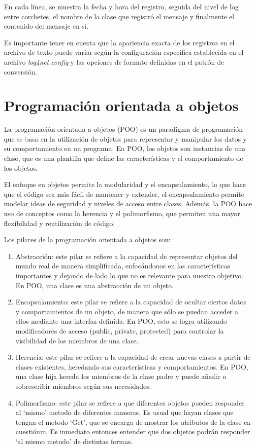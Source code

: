 \documentclass[executivepaper]{article}
\begin{document}
En cada línea, se muestra la fecha y hora del registro, seguida del nivel de log entre corchetes, el nombre de la clase que registró el mensaje y finalmente el contenido del mensaje en sí.

Es importante tener en cuenta que la apariencia exacta de los registros en el archivo de texto puede variar según la configuración específica establecida en el archivo \emph{log4net.config} y las opciones de formato definidas en el patrón de conversión.

\section{Programación orientada a objetos}

La programación orientada a objetos (POO) es un paradigma de programación que se basa en la utilización de objetos para representar y manipular los datos y su comportamiento en un programa. En POO, los objetos son instancias de una clase, que es una plantilla que define las características y el comportamiento de los objetos.

El enfoque en objetos permite la modularidad y el encapsulamiento, lo que hace que el código sea más fácil de mantener y extender, el encapsulamiento permite modelar ideas de seguridad y niveles de acceso entre clases. Además, la POO hace uso de conceptos como la herencia y el polimorfismo, que permiten una mayor flexibilidad y reutilización de código.

Los pilares de la programación orientada a objetos son:

\begin{enumerate}
    \item Abstracción: este pilar se refiere a la capacidad de representar objetos del mundo real de manera simplificada, enfocándonos en las características importantes y dejando de lado lo que no es relevante para nuestro objetivo. En POO, una clase es una abstracción de un objeto.
    \item Encapsulamiento: este pilar se refiere a la capacidad de ocultar ciertos datos y comportamientos de un objeto, de manera que sólo se puedan acceder a ellos mediante una interfaz definida. En POO, esto se logra utilizando modificadores de acceso (public, private, protected) para controlar la visibilidad de los miembros de una clase.
    \item Herencia: este pilar se refiere a la capacidad de crear nuevas clases a partir de clases existentes, heredando sus características y comportamientos. En POO, una clase hija hereda los miembros de la clase padre y puede añadir o sobrescribir miembros según sus necesidades.
    \item Polimorfismo: este pilar se refiere a que diferentes objetos pueden responder al \enquote*{mismo} metodo de diferentes maneras. Es usual que hayan clases que tengan el metodo \enquote*{Get}, que se encarga de mostrar los atributos de la clase en cuestiónm, Es inmediato entonces entender que dos objetos podrán responder \enquote*{al mismo metodo} de distintas formas. 
\end{enumerate}
\end{document}
